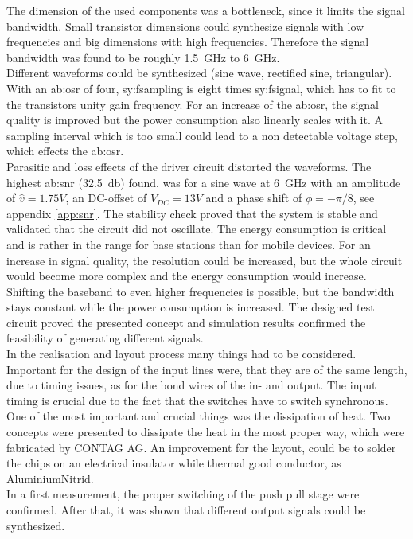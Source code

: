 The dimension of the used components was a bottleneck, since it limits the signal bandwidth.
Small transistor dimensions could synthesize signals with low frequencies and big dimensions with high frequencies.
Therefore the signal bandwidth was found to be roughly \SI{1.5}{\GHz} to \SI{6}{\GHz}.\\
Different waveforms could be synthesized (sine wave, rectified sine, triangular).
With an \gls{ab:osr} of four, \gls{sy:fsampling} is eight times \gls{sy:fsignal}, which has to fit to the transistors unity gain frequency.
For an increase of the \gls{ab:osr}, the signal quality is improved but the power consumption also linearly scales with it.
A sampling interval which is too small could lead to a non detectable voltage step, which effects the \gls{ab:osr}.\\
Parasitic and loss effects of the driver circuit distorted the waveforms.
The highest \gls{ab:snr} (\SI{32.5}{\decibel}) found, was for a sine wave at \SI{6}{\giga \hertz} with an amplitude of $\hat{v} = 1.75 V$, an DC-offset of $V_{DC} = 13 V$ and a phase shift of $\phi = -\pi/8$, see appendix \ref{app:snr}.
The stability check proved that the system is stable and validated that the circuit did not oscillate.
The energy consumption is critical and is rather in the range for base stations than for mobile devices.
For an increase in signal quality, the resolution could be increased, but the whole circuit would become more complex and the energy consumption would increase.
Shifting the baseband to even higher frequencies is possible, but the bandwidth stays constant while the power consumption is increased.
The designed test circuit proved the presented concept and simulation results confirmed the feasibility of generating different signals.\\
In the realisation and layout process many things had to be considered.
Important for the design of the input lines were, that they are of the same length, due to timing issues, as for the bond wires of the in- and output.
The input timing is crucial due to the fact that the switches have to switch synchronous.
One of the most important and crucial things was the dissipation of heat.
Two concepts were presented to dissipate the heat in the most proper way, which were fabricated by CONTAG AG.
An improvement for the layout, could be to solder the chips on an electrical insulator while thermal good conductor, as AluminiumNitrid.\\
In a first measurement, the proper switching of the push pull stage were confirmed.
After that, it was shown that different output signals could be synthesized.

